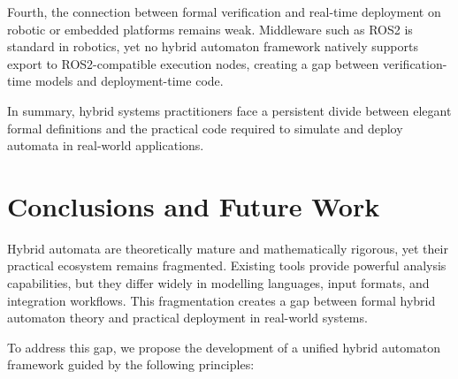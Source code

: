 \documentclass[a4paper, 12pt]{report}
\begin{document}
Fourth, the connection between formal verification and real-time deployment
on robotic or embedded platforms remains weak.  Middleware such as ROS2 is
standard in robotics, yet no hybrid automaton framework natively supports
export to ROS2-compatible execution nodes, creating a gap between
verification-time models and deployment-time code.

In summary, hybrid systems practitioners face a persistent divide between
elegant formal definitions and the practical code required to simulate and
deploy automata in real-world applications.

\section{Conclusions and Future Work}

Hybrid automata are theoretically mature and mathematically rigorous, yet
their practical ecosystem remains fragmented.  Existing tools provide
powerful analysis capabilities, but they differ widely in modelling
languages, input formats, and integration workflows.  This fragmentation
creates a gap between formal hybrid automaton theory and practical
deployment in real-world systems.

To address this gap, we propose the development of a unified hybrid
automaton framework guided by the following principles:
\end{document}

